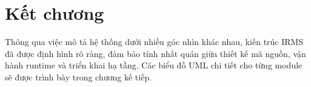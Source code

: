\section{Kết chương}
Thông qua việc mô tả hệ thống dưới nhiều góc nhìn khác nhau, kiến trúc IRMS đã được định hình rõ ràng, đảm bảo tính nhất quán giữa thiết kế mã nguồn, vận hành runtime và triển khai hạ tầng. Các biểu đồ UML chi tiết cho từng module sẽ được trình bày trong chương kế tiếp.
